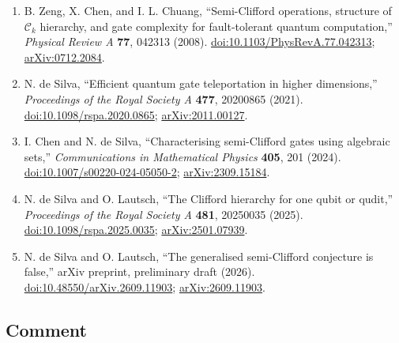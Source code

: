 \begin{enumerate}[label={},leftmargin=4.8em,labelsep=0.5em]
  \footnotesize
  \item[\textup{[ZCC08]}]\label{ref:cdd1-zcc08}
  B. Zeng, X. Chen, and I. L. Chuang, ``Semi-Clifford operations, structure of
  $\mathcal{C}_k$ hierarchy, and gate complexity for fault-tolerant quantum
  computation,'' \emph{Physical Review A} \textbf{77}, 042313 (2008).
  \href{https://doi.org/10.1103/PhysRevA.77.042313}{doi:10.1103/PhysRevA.77.042313};
  \href{https://arxiv.org/abs/0712.2084}{arXiv:0712.2084}.

  \item[\textup{[dS21]}]\label{ref:cdd1-ds21}
  N. de Silva, ``Efficient quantum gate teleportation in higher dimensions,''
  \emph{Proceedings of the Royal Society A} \textbf{477}, 20200865 (2021).
  \href{https://doi.org/10.1098/rspa.2020.0865}{doi:10.1098/rspa.2020.0865};
  \href{https://arxiv.org/abs/2011.00127}{arXiv:2011.00127}.

  \item[\textup{[CdS24]}]\label{ref:cdd1-cds24}
  I. Chen and N. de Silva, ``Characterising semi-Clifford gates using
  algebraic sets,'' \emph{Communications in Mathematical Physics} \textbf{405},
  201 (2024).
  \href{https://doi.org/10.1007/s00220-024-05050-2}{doi:10.1007/s00220-024-05050-2};
  \href{https://arxiv.org/abs/2309.15184}{arXiv:2309.15184}.

  \item[\textup{[dSL25]}]\label{ref:cdd1-dsl25}
  N. de Silva and O. Lautsch, ``The Clifford hierarchy for one qubit or
  qudit,'' \emph{Proceedings of the Royal Society A} \textbf{481}, 20250035
  (2025).
  \href{https://doi.org/10.1098/rspa.2025.0035}{doi:10.1098/rspa.2025.0035};
  \href{https://arxiv.org/abs/2501.07939}{arXiv:2501.07939}.

  \item[\textup{[dSL26]}]\label{ref:cdd1-dsl26}
  N. de Silva and O. Lautsch, ``The generalised semi-Clifford conjecture is
  false,'' arXiv preprint, preliminary draft (2026).
  \href{https://doi.org/10.48550/arXiv.2609.11903}{doi:10.48550/arXiv.2609.11903};
  \href{https://arxiv.org/abs/2609.11903}{arXiv:2609.11903}.
\end{enumerate}

\subsection*{Comment}

